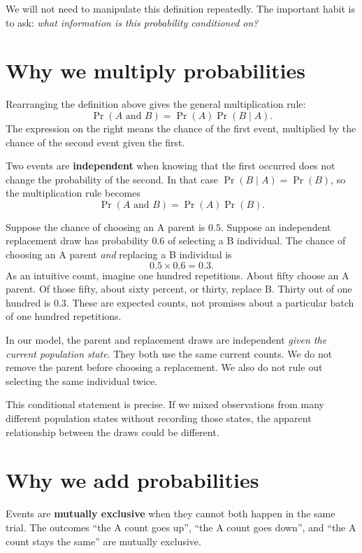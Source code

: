 We will not need to manipulate this definition repeatedly. The important
habit is to ask: \emph{what information is this probability conditioned on?}

\section{Why we multiply probabilities}

Rearranging the definition above gives the general multiplication rule:
\[
 \Pr(A\text{ and }B)=\Pr(A)\Pr(B\mid A).
\]
The expression on the right means the chance of the first event, multiplied
by the chance of the second event given the first.

Two events are \textbf{independent} when knowing that the first occurred does
not change the probability of the second. In that case
\(\Pr(B\mid A)=\Pr(B)\), so the multiplication rule becomes
\[
 \Pr(A\text{ and }B)=\Pr(A)\Pr(B).
\]

\begin{workedexample}
Suppose the chance of choosing an A parent is \(0.5\). Suppose an independent
replacement draw has probability \(0.6\) of selecting a B individual.
The chance of choosing an A parent \emph{and} replacing a B individual is
\[
  0.5\times 0.6=0.3.
\]
As an intuitive count, imagine one hundred repetitions. About fifty choose
an A parent. Of those fifty, about sixty percent, or thirty, replace B.
Thirty out of one hundred is \(0.3\). These are expected counts, not
promises about a particular batch of one hundred repetitions.
\end{workedexample}

In our model, the parent and replacement draws are independent
\emph{given the current population state}. They both use the same current
counts. We do not remove the parent before choosing a replacement. We also
do not rule out selecting the same individual twice.

This conditional statement is precise. If we mixed observations from many
different population states without recording those states, the apparent
relationship between the draws could be different.

\section{Why we add probabilities}

Events are \textbf{mutually exclusive} when they cannot both happen in the
same trial. The outcomes ``the A count goes up'', ``the A count goes down'',
and ``the A count stays the same'' are mutually exclusive.

